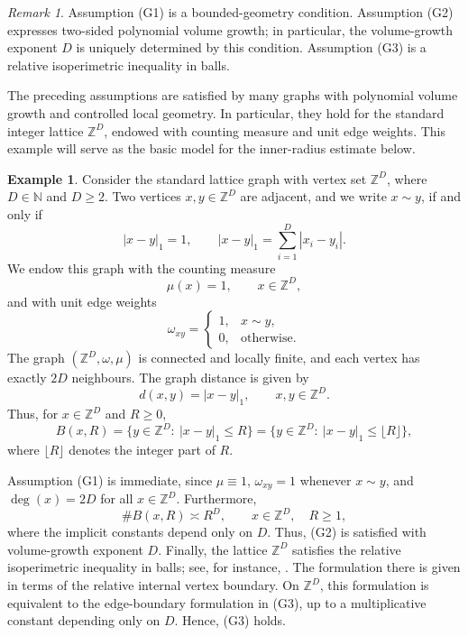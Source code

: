 \documentclass[twoside,12pt,letter]{article}
\theoremstyle{plain}
\theoremstyle{definition}
\newtheorem{example}[theorem]{Example}
\theoremstyle{remark}
\newtheorem{remark}[theorem]{Remark}
\numberwithin{equation}{section}
\begin{document}
\begin{remark}\label{rem-assumptions}
Assumption {\rm(G1)} is a bounded-geometry condition. Assumption {\rm(G2)}
expresses two-sided polynomial volume growth; in particular, the
volume-growth exponent \(D\) is uniquely determined by this condition.
Assumption {\rm(G3)} is a relative isoperimetric inequality in balls.
\end{remark}

The preceding assumptions are satisfied by many graphs with polynomial volume
growth and controlled local geometry. In particular, they hold for the standard
integer lattice \(\mathbb{Z}^D\), endowed with counting measure and unit edge
weights. This example will serve as the basic model for the inner-radius
estimate below.

\begin{example}\label{ex-lattice}
Consider the standard lattice graph with vertex set \(\mathbb{Z}^D\), where
\(D\in\mathbb{N}\) and \(D\ge 2\). Two vertices \(x,y\in\mathbb{Z}^D\) are
adjacent, and we write \(x\sim y\), if and only if
\[
|x-y|_1=1,
\qquad
|x-y|_1=\sum_{i=1}^D |x_i-y_i|.
\]
We endow this graph with the counting measure
\[
\mu(x)=1,\qquad x\in\mathbb{Z}^D,
\]
and with unit edge weights
\[
\omega_{xy}=
\begin{cases}
1, & x\sim y,\\
0, & \text{otherwise}.
\end{cases}
\]
The graph \((\mathbb{Z}^D,\omega,\mu)\) is connected and locally finite, and
each vertex has exactly \(2D\) neighbours. The graph distance is given by
\[
d(x,y)=|x-y|_1,\qquad x,y\in\mathbb{Z}^D.
\]
Thus, for \(x\in\mathbb{Z}^D\) and \(R\ge 0\),
\[
B(x,R)
=
\{y\in\mathbb{Z}^D:\ |x-y|_1\le R\}
=
\{y\in\mathbb{Z}^D:\ |x-y|_1\le \lfloor R\rfloor\},
\]
where \(\lfloor R\rfloor\) denotes the integer part of \(R\).

Assumption {\rm(G1)} is immediate, since \(\mu\equiv 1\), \(\omega_{xy}=1\)
whenever \(x\sim y\), and \(\deg(x)=2D\) for all \(x\in\mathbb{Z}^D\).
Furthermore,
\[
\#B(x,R)\asymp R^D,\qquad x\in\mathbb{Z}^D,\quad R\ge 1,
\]
where the implicit constants depend only on \(D\). Thus, {\rm(G2)} is satisfied
with volume-growth exponent \(D\). Finally, the lattice \(\mathbb{Z}^D\)
satisfies the relative isoperimetric inequality in balls; see, for instance,
\cite[Assumption 1.1 and Remark 1.2]{AndresDeuschelSlowik2016}. The formulation
there is given in terms of the relative internal vertex boundary. On
\(\mathbb{Z}^D\), this formulation is equivalent to the edge-boundary
formulation in {\rm(G3)}, up to a multiplicative constant depending only on
\(D\). Hence, {\rm(G3)} holds.
\end{example}
\end{document}
